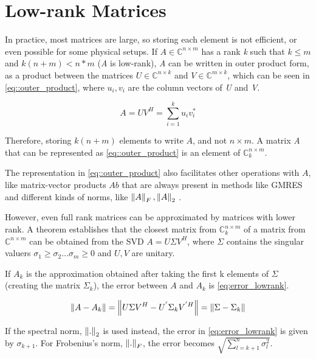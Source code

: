 
\section{Low-rank Matrices}

In practice, most matrices are large, so storing each element is not efficient, or even possible for some physical setups. If $A \in \mathbb{C}^{n\times m}$ has a rank \textit{k} such that $k \leq m$ and $k(n+m) < n*m$ (\textit{A} is low-rank), \textit{A} can be written in outer product form, as a product between the matrices $U \in \mathbb{C}^{n\times k} $ and $V \in \mathbb{C}^{m\times k}$, which can be seen in \ref{eq::outer_product}, where $u_{i}, v_{i}$ are the column vectors of \textit{U} and \textit{V}.

\begin{equation}\label{eq::outer_product}
    A = UV^{H} = \sum_{i=1} ^{k} u_{i} v_{i} ^{*}
\end{equation}


Therefore, storing $k(n+m)$ elements to write $A$, and not $n\times m$. A matrix \textit{A} that can be represented as \ref{eq::outer_product} is an element of $\mathbb{C}^{n\times m}_{k}$.

The representation in \ref{eq::outer_product} also facilitates other operations with $A$, like matrix-vector products $Ab$ that are always present in methods like GMRES \cite{bebendorf2008hierarchical} and different kinds of norms, like $\left\lVert A\right\rVert_{F}, \left\lVert A\right\rVert_{2}$ \cite{bebendorf2008hierarchical}.

However, even full rank matrices can be approximated by matrices with lower rank. A theorem \cite{bebendorf2008hierarchical} establishes that the closest matrix from $\mathbb{C}^{n\times m}_{k}$ of a matrix from $\mathbb{C}^{n\times m}$ can be obtained from the SVD $A = U \Sigma V^{H}$, where $\Sigma$ contains the singular valuers $\sigma_{1} \geq \sigma_{2} \dots \sigma_{m} \geq 0$ and $U,V$ are unitary.

If $ A_{k} $ is the approximation obtained after taking the first k elements of $\Sigma$ (creating the matrix $ \Sigma_{k} $), the error between $ A $ and $ A_{k} $ is \ref{eq:error_lowrank}.

\begin{equation}\label{eq:error_lowrank}
    \left\lVert A-A_{k}\right\rVert = \left\lVert U\Sigma V^{H} - U^{'} \Sigma_{k} V^{' H}\right\rVert = \left\lVert\Sigma - \Sigma_{k}\right\rVert
\end{equation}

If the spectral norm, $\left\lVert.\right\rVert_{2} $ is used instead, the error in \ref{eq:error_lowrank} is given by $\sigma_{k+1}$. For Frobenius's norm, $\left\lVert.\right\rVert_{F}$, the error becomes $\sqrt{\sum^{n}_{l=k+1} \sigma^{2}_{l}}$.

